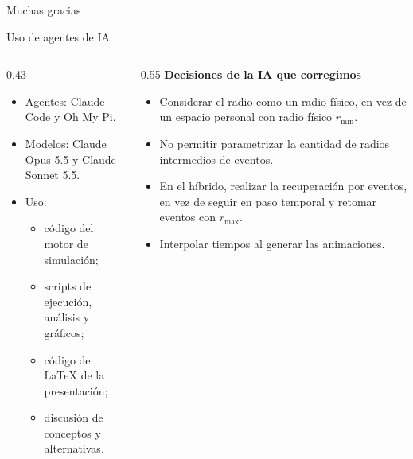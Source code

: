 \documentclass[aspectratio=169]{beamer}
\newcommand{\rmin}{r_{\min}}
\newcommand{\rmax}{r_{\max}}
\begin{document}
\begin{frame}[plain]
  \centering
  \vfill
  {\Huge Muchas gracias}
  \vfill
\end{frame}

\begin{frame}{Uso de agentes de IA}
  \small
  \begin{columns}[T]
    \begin{column}{0.43\textwidth}
      \begin{itemize}\setlength{\itemsep}{0.5em}
        \item Agentes: Claude Code y Oh My Pi.
        \item Modelos: Claude Opus 5.5 y Claude Sonnet 5.5.
        \item Uso:
          \begin{itemize}\setlength{\itemsep}{0.2em}
            \item código del motor de simulación;
            \item scripts de ejecución, análisis y gráficos;
            \item código de LaTeX de la presentación;
            \item discusión de conceptos y alternativas.
          \end{itemize}
      \end{itemize}
    \end{column}
    \begin{column}{0.55\textwidth}
      \textbf{Decisiones de la IA que corregimos}
      \begin{itemize}\setlength{\itemsep}{0.5em}
        \item Considerar el radio como un radio físico, en vez de un espacio personal con radio
          físico $\rmin$.
        \item No permitir parametrizar la cantidad de radios intermedios de eventos.
        \item En el híbrido, realizar la recuperación por eventos, en vez de seguir en paso
          temporal y retomar eventos con $\rmax$.
        \item Interpolar tiempos al generar las animaciones.
      \end{itemize}
    \end{column}
  \end{columns}
\end{frame}
\end{document}
